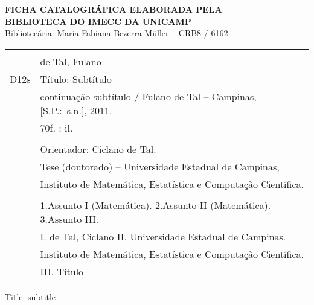 \begin{titlepage}
\newpage

\thispagestyle{plain}
{

\begin{center}
{ \sf \Large \textbf{FICHA CATALOGR\'AFICA ELABORADA PELA\\ BIBLIOTECA DO IMECC
DA UNICAMP}} \\
Bibliotec\'aria: Maria Fabiana Bezerra M\"uller -- CRB8 / 6162 \\[1cm]
\end{center}

\begin{center}

\begin{tabular}{|cl|} \hline
  \hspace{1.3cm} & \\
  & de Tal, Fulano  \\
  \hspace{0.2cm} D12s & \hspace{0.6cm} T\'itulo: Subt\'itulo  \\ 
  &  continua\c{c}\~ao subt\'itulo / Fulano de Tal --
  Campinas,  [S.P.:~s.n.], 2011. \\
  & \hspace{0.65cm} 70f. : il. \\
  & \\
  & \hspace{0.6cm} Orientador: Ciclano de Tal.\\
  & \hspace{0.6cm} Tese (doutorado) -- 
Universidade Estadual de Campinas, \\
  & Instituto de Matem\'atica, Estat\'istica e Computa\c{c}\~ao
  Cient\'ifica.\\ 
  & \\
  & \hspace{0.6cm} 1.Assunto I (Matem\'atica). 2.Assunto II (Matem\'atica).  
  3.Assunto III.  \\ 
  & I. de Tal, Ciclano   \hspace{0.1cm} II. Universidade Estadual de
Campinas.  \\
  & Instituto
  de Matem\'atica, Estat\'istica e Computa\c{c}\~ao Cient\'ifica. \\   
  &  III. T\'itulo \\
  \hline
\end{tabular}
\end{center}
}\vfill
\doublespacing


 Title: subtitle


\end{titlepage}
